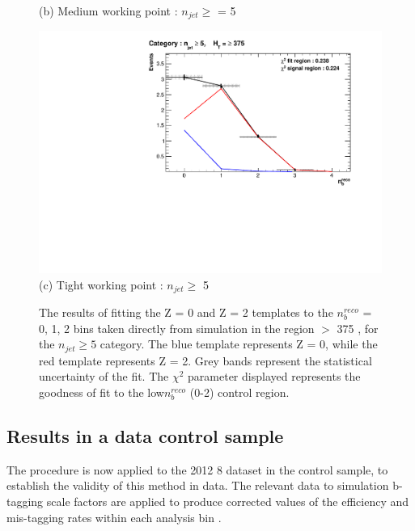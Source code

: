 \begin{figure}[ht]
\begin{minipage}[b]{0.51\linewidth}
\centering (b) Medium working point : $n_{jet} \geq$ = 5 
\end{minipage}
\quad
\begin{minipage}[b]{0.51\linewidth}
\centering
\includegraphics[width = 1.0\linewidth]{plots/ThesisPlots/Final_Fit_To_MC_Normal_Tight_HTBin_OneMuon_Template_375_jet_mult_5.pdf}
\centering (c) Tight working point : $n_{jet} \geq$ 5 
\end{minipage}
\caption[The results of fitting the Z = 0 and Z = 2 templates to the $n_{b}^{reco}$ = 0, 1, 2 bins taken directly from simulation in the region \theht $>$ 375 \GeV, for the $n_{jet} \geq 5$ category.]{The results of fitting the Z = 0 and Z = 2 templates to the $n_{b}^{reco}$ = 0, 1, 2 bins taken directly from simulation in the region \theht $>$ 375 \GeV, for the $n_{jet} \geq 5$ category. The blue template represents Z = 0, while the red template represents Z = 2. Grey bands represent the statistical uncertainty of the fit. The $\chi^{2}$ parameter displayed represents the goodness of fit to the low$ n_{b}^{reco}$ (0-2) control region.}
\label{fig:template_closure_njet5}
\end{figure}

\FloatBarrier
\subsection{Results in a data control sample}
\label{subsec:templatedataresults}

The procedure is now applied to the 2012 8 \TeV dataset in the \mupjets control sample, to establish the validity of this method in data. The relevant data to simulation b-tagging scale factors are applied to produce corrected values of the efficiency and mis-tagging rates within each analysis bin \cite{btagscalefactor}. 


